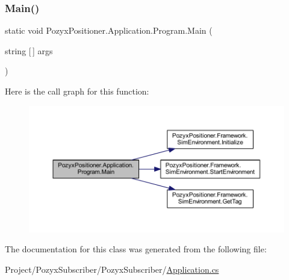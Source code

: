 \subsubsection{\texorpdfstring{Main()}{Main()}}
{\footnotesize\ttfamily static void Pozyx\+Positioner.\+Application.\+Program.\+Main (\begin{DoxyParamCaption}\item[{string \mbox{[}$\,$\mbox{]}}]{args }\end{DoxyParamCaption})\hspace{0.3cm}{\ttfamily [static]}}

Here is the call graph for this function\+:
\nopagebreak
\begin{figure}[H]
\begin{center}
\leavevmode
\includegraphics[width=350pt]{class_pozyx_positioner_1_1_application_1_1_program_a8f5cebbeb8f01e37365775321387282a_cgraph}
\end{center}
\end{figure}


The documentation for this class was generated from the following file\+:\begin{DoxyCompactItemize}
\item 
Project/\+Pozyx\+Subscriber/\+Pozyx\+Subscriber/\hyperlink{_application_8cs}{Application.\+cs}\end{DoxyCompactItemize}
